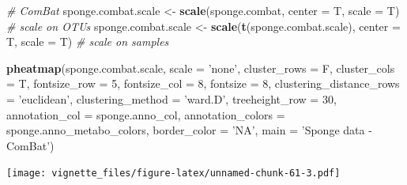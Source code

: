 \documentclass[]{book}
\newenvironment{Shaded}{\begin{snugshade}}{\end{snugshade}}
\newcommand{\KeywordTok}[1]{\textcolor[rgb]{0.13,0.29,0.53}{\textbf{#1}}}
\newcommand{\DataTypeTok}[1]{\textcolor[rgb]{0.13,0.29,0.53}{#1}}
\newcommand{\DecValTok}[1]{\textcolor[rgb]{0.00,0.00,0.81}{#1}}
\newcommand{\StringTok}[1]{\textcolor[rgb]{0.31,0.60,0.02}{#1}}
\newcommand{\CommentTok}[1]{\textcolor[rgb]{0.56,0.35,0.01}{\textit{#1}}}
\newcommand{\NormalTok}[1]{#1}
\begin{document}
\begin{Shaded}
\begin{Highlighting}[]
\CommentTok{# ComBat }
\NormalTok{sponge.combat.scale <-}\StringTok{ }\KeywordTok{scale}\NormalTok{(sponge.combat, }\DataTypeTok{center =}\NormalTok{ T, }\DataTypeTok{scale =}\NormalTok{ T) }
\CommentTok{# scale on OTUs}
\NormalTok{sponge.combat.scale <-}\StringTok{ }\KeywordTok{scale}\NormalTok{(}\KeywordTok{t}\NormalTok{(sponge.combat.scale), }\DataTypeTok{center =}\NormalTok{ T, }\DataTypeTok{scale =}\NormalTok{ T) }
\CommentTok{# scale on samples}

\KeywordTok{pheatmap}\NormalTok{(sponge.combat.scale, }
         \DataTypeTok{scale =} \StringTok{'none'}\NormalTok{, }
         \DataTypeTok{cluster_rows =}\NormalTok{ F, }
         \DataTypeTok{cluster_cols =}\NormalTok{ T, }
         \DataTypeTok{fontsize_row =} \DecValTok{5}\NormalTok{, }\DataTypeTok{fontsize_col =} \DecValTok{8}\NormalTok{,}
         \DataTypeTok{fontsize =} \DecValTok{8}\NormalTok{,}
         \DataTypeTok{clustering_distance_rows =} \StringTok{'euclidean'}\NormalTok{,}
         \DataTypeTok{clustering_method =} \StringTok{'ward.D'}\NormalTok{,}
         \DataTypeTok{treeheight_row =} \DecValTok{30}\NormalTok{,}
         \DataTypeTok{annotation_col =}\NormalTok{ sponge.anno_col,}
         \DataTypeTok{annotation_colors =}\NormalTok{ sponge.anno_metabo_colors,}
         \DataTypeTok{border_color =} \StringTok{'NA'}\NormalTok{,}
         \DataTypeTok{main =} \StringTok{'Sponge data - ComBat'}\NormalTok{)}
\end{Highlighting}
\end{Shaded}

\texttt{[image: vignette\_files/figure-latex/unnamed-chunk-61-3.pdf]}
\end{document}
